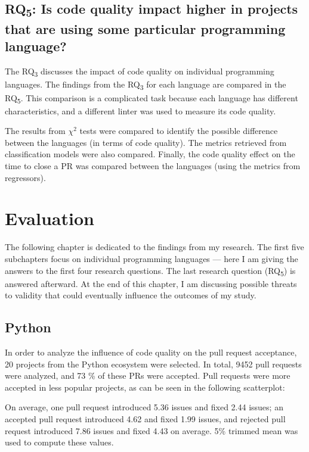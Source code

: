 \documentclass[digital,oneside,oldtable,nolof,nolot,nocover]{fithesis4}
\begin{document}
\section{RQ\textsubscript{5}: Is code quality impact higher in projects that are using some particular programming language?}
\label{sec:orgce6a5cd}
The RQ\textsubscript{3} discusses the impact of code quality on individual
programming languages. The findings from the RQ\textsubscript{3} for each
language are compared in the RQ\textsubscript{5}. This comparison is a complicated
task because each language has different characteristics, and
a different linter was used to measure its code quality.

The results from \(\chi^2\) tests were compared to identify
the possible difference between the languages (in terms of code
quality). The metrics retrieved from classification models were
also compared. Finally, the code quality effect on the time to close a PR
was compared between the languages (using the metrics from regressors).
\chapter{Evaluation}
\label{sec:orgc57a942}
The following chapter is dedicated to the findings from my research.  The first
five subchapters focus on individual programming languages --- here I am
giving the answers to the first four research questions.  The last research
question (RQ\textsubscript{5}) is answered afterward. At the end of this chapter, I am
discussing possible threats to validity that could eventually influence the
outcomes of my study.
\section{Python}
\label{sec:orgba51c19}
In order to analyze the influence of code quality on the pull request
acceptance, 20 projects from the Python ecosystem were selected.
In total, 9452 pull requests were analyzed, and 73 \% of these PRs were accepted.
Pull requests were more accepted in less popular projects, as can be seen in
the following scatterplot:

On average, one pull request introduced 5.36 issues and fixed 2.44 issues;
an accepted pull request introduced 4.62 and fixed 1.99 issues, and rejected
pull request introduced 7.86 issues and fixed 4.43 on average.
5\% trimmed mean was used to compute these values.
\end{document}

